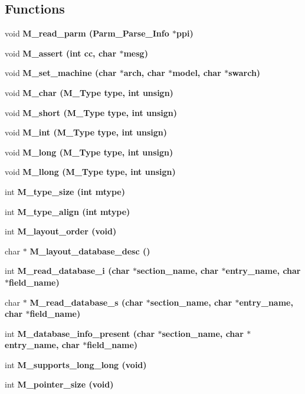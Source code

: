 \subsection*{Functions}
\begin{CompactItemize}
\item 
void \bf{M\_\-read\_\-parm} (\bf{Parm\_\-Parse\_\-Info} $\ast$ppi)
\item 
void \bf{M\_\-assert} (int cc, char $\ast$mesg)
\item 
void \bf{M\_\-set\_\-machine} (char $\ast$arch, char $\ast$model, char $\ast$swarch)
\item 
void \bf{M\_\-char} (\bf{M\_\-Type} type, int unsign)
\item 
void \bf{M\_\-short} (\bf{M\_\-Type} type, int unsign)
\item 
void \bf{M\_\-int} (\bf{M\_\-Type} type, int unsign)
\item 
void \bf{M\_\-long} (\bf{M\_\-Type} type, int unsign)
\item 
void \bf{M\_\-llong} (\bf{M\_\-Type} type, int unsign)
\item 
int \bf{M\_\-type\_\-size} (int mtype)
\item 
int \bf{M\_\-type\_\-align} (int mtype)
\item 
int \bf{M\_\-layout\_\-order} (void)
\item 
char $\ast$ \bf{M\_\-layout\_\-database\_\-desc} ()
\item 
int \bf{M\_\-read\_\-database\_\-i} (char $\ast$section\_\-name, char $\ast$entry\_\-name, char $\ast$field\_\-name)
\item 
char $\ast$ \bf{M\_\-read\_\-database\_\-s} (char $\ast$section\_\-name, char $\ast$entry\_\-name, char $\ast$field\_\-name)
\item 
int \bf{M\_\-database\_\-info\_\-present} (char $\ast$section\_\-name, char $\ast$entry\_\-name, char $\ast$field\_\-name)
\item 
int \bf{M\_\-supports\_\-long\_\-long} (void)
\item 
int \bf{M\_\-pointer\_\-size} (void)
\end{CompactItemize}
